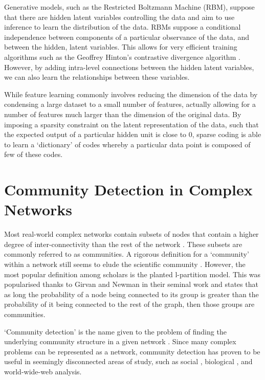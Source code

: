 \documentclass{report}
\begin{document}
	Generative models, such as the Restricted Boltzmann Machine (RBM), suppose that there are hidden latent variables controlling the data and aim to use inference to learn the distribution of the data. RBMs suppose a conditional independence between components of a particular observance of the data, and between the hidden, latent variables. This allows for very efficient training algorithms such as the Geoffrey Hinton's contrastive divergence algorithm \cite{hinton2002training}. However, by adding intra-level connections between the hidden latent variables, we can also learn the relationships between these variables. 
	
	While feature learning commonly involves reducing the dimension of the data by condensing a large dataset to a small number of features, actually allowing for a number of features much larger than the dimension of the original data. By imposing a sparsity constraint on the latent representation of the data, such that the expected output of a particular hidden unit is close to 0, sparse coding is able to learn a `dictionary' of codes whereby a particular data point is composed of few of these codes.
	
 

	\chapter{Community Detection in Complex Networks}

	Most real-world complex networks contain subsets of nodes that contain a higher degree of inter-connectivity than the rest of the network
	\cite{lancichinetti2009detecting}.
	These subsets are commonly referred to as communities. 
	A rigorous definition for a `community' within a network still seems to elude the scientific community \cite{lancichinetti2009detecting}.
	However, the most popular definition among scholars is the planted l-partition model. 
	This was popularised thanks to Girvan and Newman in their seminal work \cite{girvan2002community} and states that as long the probability of a node being connected to its group is greater than the probability of it being connected to the rest of the graph, then those groups are communities. 
	
	`Community detection' is the name given to the problem of finding the underlying community structure in a given network \cite{girvan2002community}. 
	Since many complex problems can be represented as a network, community detection has proven to be useful in seemingly disconnected areas of study, such as social \cite{barber2007modularity}, biological \cite{fortunato2007resolution}, and world-wide-web \cite{danon2006effect} analysis.
	
\end{document}
